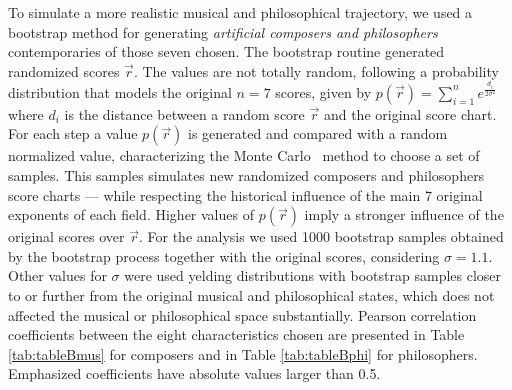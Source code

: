 \documentclass[
 aip,
 jmp,
 amsmath,amssymb,
 reprint,
]{revtex4-1}
\begin{document}
To simulate a more realistic musical and philosophical trajectory, we used a bootstrap method for generating \emph{artificial composers and philosophers} contemporaries of those seven chosen.
The bootstrap routine generated randomized scores $\vec{r}$. The
values are not totally random, following a probability distribution
that models the original $n = 7$ scores, given by 
$p(\vec{r}) = \sum^n_{i=1} e^{\frac{d_i}{2\sigma^2}}$
where $d_i$ is the distance between a random score $\vec{r}$
and the original score chart. For each step a
value $p(\vec{r})$ is generated and compared with a random normalized value,
characterizing the Monte Carlo~\cite{Robert2011} method to choose a set of samples. This
samples simulates new randomized composers and philosophers score charts --- while respecting the historical influence of the main 7 original exponents of each field. Higher
values of $p(\vec{r})$ imply a stronger influence of the original scores
over $\vec{r}$. For the analysis
we used 1000 bootstrap samples obtained by the bootstrap process
together with the original scores,
considering $\sigma = 1.1$. Other values for $\sigma$ were used yelding 
distributions with bootstrap samples closer to or further from the original 
musical and philosophical states, which does not affected the musical or philosophical space substantially.
Pearson correlation coefficients between the eight
characteristics chosen are presented in Table \ref{tab:tableBmus} for composers and in Table \ref{tab:tableBphi} for philosophers. Emphasized coefficients have absolute values larger than 0.5.
\end{document}
